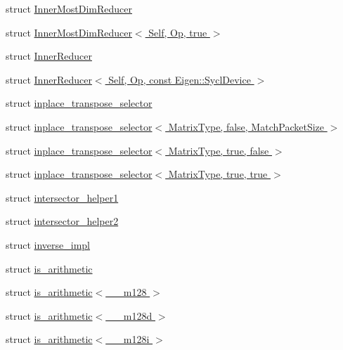 \begin{DoxyCompactItemize}
struct \hyperlink{struct_eigen_1_1internal_1_1_inner_most_dim_reducer}{Inner\+Most\+Dim\+Reducer}
\item 
struct \hyperlink{struct_eigen_1_1internal_1_1_inner_most_dim_reducer_3_01_self_00_01_op_00_01true_01_4}{Inner\+Most\+Dim\+Reducer$<$ Self, Op, true $>$}
\item 
struct \hyperlink{struct_eigen_1_1internal_1_1_inner_reducer}{Inner\+Reducer}
\item 
struct \hyperlink{struct_eigen_1_1internal_1_1_inner_reducer_3_01_self_00_01_op_00_01const_01_eigen_1_1_sycl_device_01_4}{Inner\+Reducer$<$ Self, Op, const Eigen\+::\+Sycl\+Device $>$}
\item 
struct \hyperlink{struct_eigen_1_1internal_1_1inplace__transpose__selector}{inplace\+\_\+transpose\+\_\+selector}
\item 
struct \hyperlink{struct_eigen_1_1internal_1_1inplace__transpose__selector_3_01_matrix_type_00_01false_00_01_match_packet_size_01_4}{inplace\+\_\+transpose\+\_\+selector$<$ Matrix\+Type, false, Match\+Packet\+Size $>$}
\item 
struct \hyperlink{struct_eigen_1_1internal_1_1inplace__transpose__selector_3_01_matrix_type_00_01true_00_01false_01_4}{inplace\+\_\+transpose\+\_\+selector$<$ Matrix\+Type, true, false $>$}
\item 
struct \hyperlink{struct_eigen_1_1internal_1_1inplace__transpose__selector_3_01_matrix_type_00_01true_00_01true_01_4}{inplace\+\_\+transpose\+\_\+selector$<$ Matrix\+Type, true, true $>$}
\item 
struct \hyperlink{struct_eigen_1_1internal_1_1intersector__helper1}{intersector\+\_\+helper1}
\item 
struct \hyperlink{struct_eigen_1_1internal_1_1intersector__helper2}{intersector\+\_\+helper2}
\item 
struct \hyperlink{struct_eigen_1_1internal_1_1inverse__impl}{inverse\+\_\+impl}
\item 
struct \hyperlink{struct_eigen_1_1internal_1_1is__arithmetic}{is\+\_\+arithmetic}
\item 
struct \hyperlink{struct_eigen_1_1internal_1_1is__arithmetic_3_01____m128_01_4}{is\+\_\+arithmetic$<$ \+\_\+\+\_\+m128 $>$}
\item 
struct \hyperlink{struct_eigen_1_1internal_1_1is__arithmetic_3_01____m128d_01_4}{is\+\_\+arithmetic$<$ \+\_\+\+\_\+m128d $>$}
\item 
struct \hyperlink{struct_eigen_1_1internal_1_1is__arithmetic_3_01____m128i_01_4}{is\+\_\+arithmetic$<$ \+\_\+\+\_\+m128i $>$}

\end{DoxyCompactItemize}

